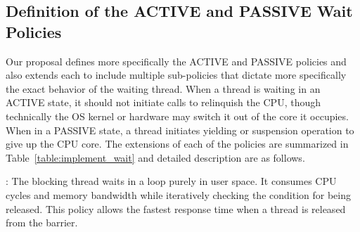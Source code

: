 \subsection{Definition of the {\sf ACTIVE} and {\sf PASSIVE} Wait Policies}
Our proposal defines more specifically 
the {\sf ACTIVE} and {\sf PASSIVE} policies and also extends each to include multiple sub-policies that dictate more
specifically the exact behavior of the waiting thread. 
When a thread is waiting in an {\sf ACTIVE} state, it should not initiate calls to
relinquish the CPU, though technically the OS kernel or hardware may switch it out of the core it occupies. 
When in a {\sf PASSIVE} state, a thread initiates yielding or suspension operation to give up the CPU core. 
The extensions of each of the policies are summarized in Table~\ref{table:implement_wait} and detailed description
 are as follows. %
\begin{table}[ht]
	\centering
{}
\label{table:implement_wait}
\caption{Wait Policies}
\end{table}

{}: The blocking thread waits in a loop purely in user space. 
		It consumes CPU cycles and memory bandwidth while iteratively checking
		the condition for being released. This policy allows the fastest response time when a thread is
		released from the barrier. 

